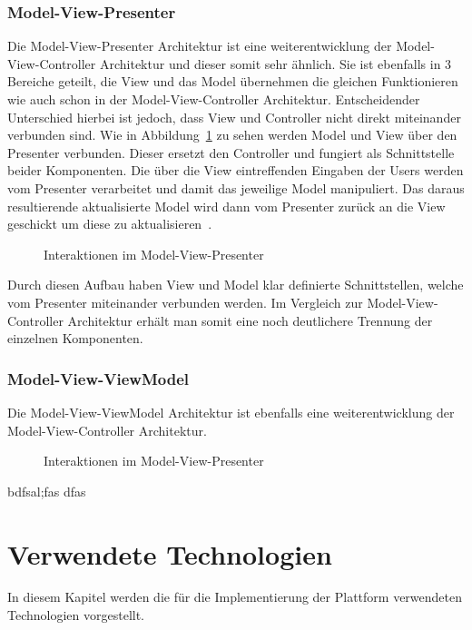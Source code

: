     \subsection{Model-View-Presenter}\label{subsec:model-view-presenter}
    Die Model-View-Presenter Architektur ist eine weiterentwicklung der Model-View-Controller Architektur und dieser somit sehr ähnlich.
    Sie ist ebenfalls in 3 Bereiche geteilt, die View und das Model übernehmen die gleichen Funktionieren wie auch schon in der Model-View-Controller Architektur.
    Entscheidender Unterschied hierbei ist jedoch, dass View und Controller nicht direkt miteinander verbunden sind.
    Wie in Abbildung~\ref{fig:mvp} zu sehen werden Model und View über den Presenter verbunden.
    Dieser ersetzt den Controller und fungiert als Schnittstelle beider Komponenten.
    Die über die View eintreffenden Eingaben der Users werden vom Presenter verarbeitet und damit das jeweilige Model manipuliert.
    Das daraus resultierende aktualisierte Model wird dann vom Presenter zurück an die View geschickt um diese zu aktualisieren~\cite{mvp1}.
    \begin{figure}[h]
        \centering
        
        \caption{Interaktionen im Model-View-Presenter}
        \label{fig:mvp}
    \end{figure}

    Durch diesen Aufbau haben View und Model klar definierte Schnittstellen, welche vom Presenter miteinander verbunden werden.
    Im Vergleich zur Model-View-Controller Architektur erhält man somit eine noch deutlichere Trennung der einzelnen Komponenten.~\cite{mvp2}

    \subsection{Model-View-ViewModel}\label{subsec:model-view-viewmodel}
    Die Model-View-ViewModel Architektur ist ebenfalls eine weiterentwicklung der Model-View-Controller Architektur.


    \begin{figure}[h]
        \centering
        
        \caption{Interaktionen im Model-View-Presenter}
        \label{fig:mvvm}
    \end{figure}


    bdfsal;fas dfas


    \chapter{Verwendete Technologien}\label{ch:verwendete-technologien}
    In diesem Kapitel werden die für die Implementierung der Plattform verwendeten Technologien vorgestellt.



